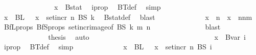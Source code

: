 \begin{isabellebody}
\ {}\isanewline
\ \ \ \ \ \ \ \ \ \ \isamarkupfalse%
\ \isamarkupfalse%
\ {\isachardoublequoteopen}x\ {\isasymin}\ Bstat{\isachardoublequoteclose}\ \isamarkupfalse%
\ i{\isacharunderscore}{\kern0pt}prop\ \isamarkupfalse%
\ BT{\isacharunderscore}{\kern0pt}def\ \isamarkupfalse%
\ simp\isanewline
\ \ \ \ \ \ \ \ \ \ \isamarkupfalse%
\ \isamarkupfalse%
\ {\isachardoublequoteopen}x\ {\isasymin}\ BL\ {}\ {\isasymor}\ x\ {\isasymin}\ set{\isacharunderscore}{\kern0pt}incr\ n\ {\isacharparenleft}{\kern0pt}BS\ k{\isacharparenright}{\kern0pt}{\isachardoublequoteclose}\ \isamarkupfalse%
\ Bstat{\isacharunderscore}{\kern0pt}def\ \isamarkupfalse%
\ blast\isanewline
\ \ \ \ \ \ \ \ \ \ \isamarkupfalse%
\ \isamarkupfalse%
\ {\isachardoublequoteopen}x\ {\isasymin}\ {\isacharbraceleft}{\kern0pt}{\isachardot}{\kern0pt}{\isachardot}{\kern0pt}{\isacharless}{\kern0pt}n{\isacharbraceright}{\kern0pt}\ {\isasymor}\ x\ {\isasymin}\ {\isacharbraceleft}{\kern0pt}n{\isachardot}{\kern0pt}{\isachardot}{\kern0pt}{\isacharless}{\kern0pt}n{\isacharplus}{\kern0pt}m{\isacharbraceright}{\kern0pt}{\isachardoublequoteclose}\ \isamarkupfalse%
\ BfL{\isacharunderscore}{\kern0pt}props\ BfS{\isacharunderscore}{\kern0pt}props{\isacharparenleft}{\kern0pt}{}{\isacharparenright}{\kern0pt}\ set{\isacharunderscore}{\kern0pt}incr{\isacharunderscore}{\kern0pt}image{\isacharbrackleft}{\kern0pt}of\ BS\ k\ m\ n{\isacharbrackright}{\kern0pt}\ \isanewline
\ \ \ \ \ \ \ \ \ \ \ \ \isamarkupfalse%
\ blast\isanewline
\ \ \ \ \ \ \ \ \ \ \isamarkupfalse%
\ \isamarkupfalse%
\ {\isacharquery}{\kern0pt}thesis\ \isamarkupfalse%
\ auto\isanewline
\ \ \ \ \ \ \ \ \isamarkupfalse%
\isanewline
\ \ \ \ \ \ \ \ \ \ \isamarkupfalse%
\ {}\isanewline
\ \ \ \ \ \ \ \ \ \ \isamarkupfalse%
\ \isamarkupfalse%
\ {\isachardoublequoteopen}x\ {\isasymin}\ Bvar\ i{\isachardoublequoteclose}\ \isamarkupfalse%
\ i{\isacharunderscore}{\kern0pt}prop\ \isamarkupfalse%
\ BT{\isacharunderscore}{\kern0pt}def\ \isamarkupfalse%
\ simp\isanewline
\ \ \ \ \ \ \ \ \ \ \isamarkupfalse%
\ \isamarkupfalse%
\ {\isachardoublequoteopen}x\ {\isasymin}\ BL\ {}\ {\isasymor}\ x\ {\isasymin}\ set{\isacharunderscore}{\kern0pt}incr\ n\ {\isacharparenleft}{\kern0pt}BS\ {\isacharparenleft}{\kern0pt}i\ {\isacharminus}{\kern0pt}\ {}{\isacharparenright}{\kern0pt}{\isacharparenright}{\kern0pt}{\isachardoublequoteclose}\ \isamarkupfalse%

\end{isabellebody}
